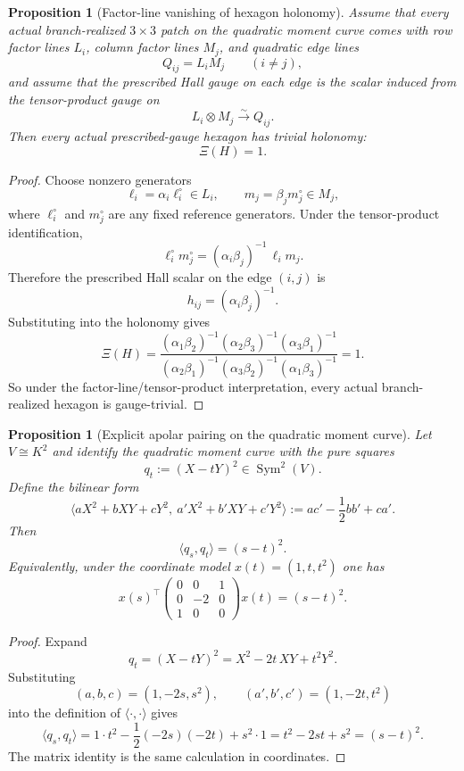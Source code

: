 \documentclass[11pt]{article}
\newtheorem{proposition}[theorem]{Proposition}
\theoremstyle{definition}
\newcommand{\1}{\mathbf{1}}
\begin{document}
\begin{proposition}[Factor-line vanishing of hexagon holonomy]\label{prop:555-factor-line}
Assume that every actual branch-realized $3\times 3$ patch on the quadratic moment curve comes with row factor lines $L_i$, column factor lines $M_j$, and quadratic edge lines
\[
Q_{ij}=L_iM_j
\qquad (i\neq j),
\]
and assume that the prescribed Hall gauge on each edge is the scalar induced from the tensor-product gauge on
\[
L_i\otimes M_j \xrightarrow{\sim} Q_{ij}.
\]
Then every actual prescribed-gauge hexagon has trivial holonomy:
\[
\Xi(H)=1.
\]
\end{proposition}

\begin{proof}
Choose nonzero generators
\[
\ell_i=\alpha_i \ell_i^\circ\in L_i,
\qquad
m_j=\beta_j m_j^\circ\in M_j,
\]
where $\ell_i^\circ$ and $m_j^\circ$ are any fixed reference generators. Under the tensor-product identification,
\[
\ell_i^\circ m_j^\circ=(\alpha_i\beta_j)^{-1}\,\ell_i m_j.
\]
Therefore the prescribed Hall scalar on the edge $(i,j)$ is
\[
h_{ij}=(\alpha_i\beta_j)^{-1}.
\]
Substituting into the holonomy gives
\[
\Xi(H)
=
\frac{(\alpha_1\beta_2)^{-1}(\alpha_2\beta_3)^{-1}(\alpha_3\beta_1)^{-1}}
{(\alpha_2\beta_1)^{-1}(\alpha_3\beta_2)^{-1}(\alpha_1\beta_3)^{-1}}
=1.
\]
So under the factor-line/tensor-product interpretation, every actual branch-realized hexagon is gauge-trivial.
\end{proof}

\begin{proposition}[Explicit apolar pairing on the quadratic moment curve]\label{prop:555-apolar}
Let $V\cong K^2$ and identify the quadratic moment curve with the pure squares
\[
q_t:=(X-tY)^2\in \operatorname{Sym}^2(V).
\]
Define the bilinear form
\[
\langle aX^2+bXY+cY^2,\ a'X^2+b'XY+c'Y^2\rangle
:=
ac'-\frac12 bb'+ca'.
\]
Then
\[
\langle q_s,q_t\rangle=(s-t)^2.
\]
Equivalently, under the coordinate model $x(t)=(1,t,t^2)$ one has
\[
x(s)^\top
\begin{pmatrix}
0&0&1\\
0&-2&0\\
1&0&0
\end{pmatrix}
x(t)
=
(s-t)^2.
\]
\end{proposition}

\begin{proof}
Expand
\[
q_t=(X-tY)^2=X^2-2t\,XY+t^2Y^2.
\]
Substituting
\[
(a,b,c)=(1,-2s,s^2),
\qquad
(a',b',c')=(1,-2t,t^2)
\]
into the definition of $\langle\cdot,\cdot\rangle$ gives
\[
\langle q_s,q_t\rangle
=
1\cdot t^2-\frac12(-2s)(-2t)+s^2\cdot 1
=
t^2-2st+s^2
=
(s-t)^2.
\]
The matrix identity is the same calculation in coordinates.
\end{proof}
\end{document}
